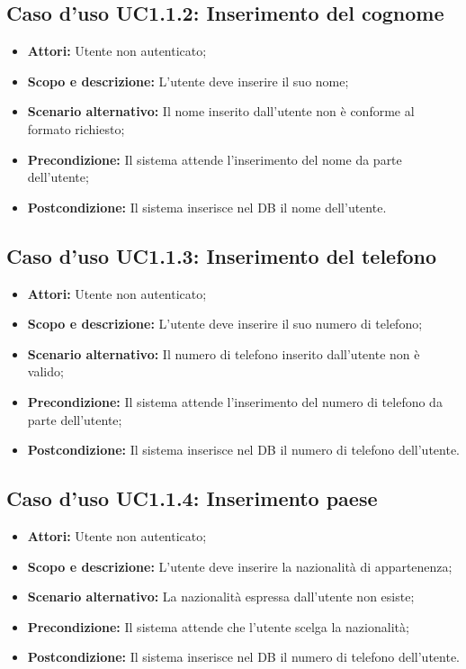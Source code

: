 \documentclass[12pt,a4paper,titlepage]{article}
\begin{document}
\subsection{Caso d'uso UC1.1.2: Inserimento del cognome}
\begin{itemize}
	\item \textbf{Attori:} Utente non autenticato;
	\item \textbf{Scopo e descrizione:} L'utente deve inserire il suo nome;
	\item \textbf{Scenario alternativo:} Il nome inserito dall'utente non è conforme al formato richiesto;
	\item \textbf{Precondizione:} Il sistema attende l'inserimento del nome da parte dell'utente;
	\item \textbf{Postcondizione:} Il sistema inserisce nel DB il nome dell'utente.
\end{itemize}
\subsection{Caso d'uso UC1.1.3: Inserimento del telefono}
\begin{itemize}
	\item \textbf{Attori:} Utente non autenticato;
	\item \textbf{Scopo e descrizione:} L'utente deve inserire il suo numero di telefono;
	\item \textbf{Scenario alternativo:} Il numero di telefono inserito dall'utente non è valido;
	\item \textbf{Precondizione:} Il sistema attende l'inserimento del numero di telefono da parte dell'utente;
	\item \textbf{Postcondizione:} Il sistema inserisce nel DB il numero di telefono dell'utente.
\end{itemize}
\subsection{Caso d'uso UC1.1.4: Inserimento paese}
\begin{itemize}
	\item \textbf{Attori:} Utente non autenticato;
	\item \textbf{Scopo e descrizione:} L'utente deve inserire la nazionalità di appartenenza;
	\item \textbf{Scenario alternativo:} La nazionalità espressa dall'utente non esiste;
	\item \textbf{Precondizione:} Il sistema attende che l'utente scelga la nazionalità;
	\item \textbf{Postcondizione: }Il sistema inserisce nel DB il numero di telefono dell'utente.
\end{itemize}
\end{document}
